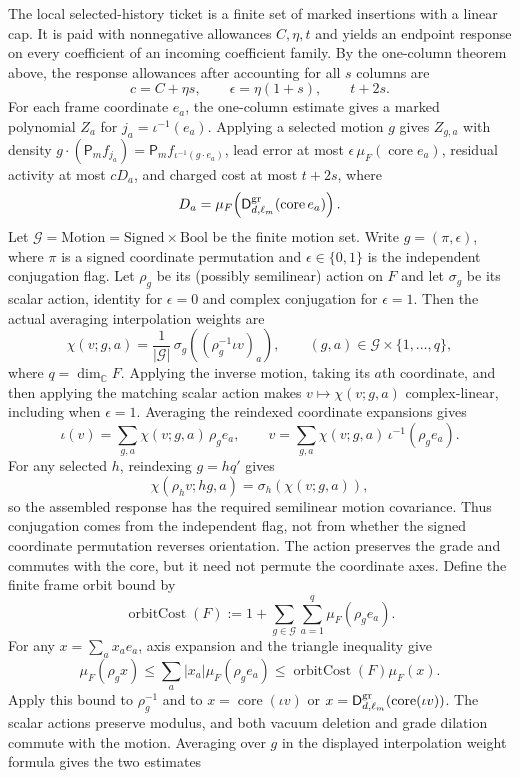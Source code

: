 The local selected-history ticket is a finite set of marked insertions with a linear cap. It is paid with nonnegative allowances $C,\eta,t$ and yields an endpoint response on every coefficient of an incoming coefficient family. By the one-column theorem above, the response allowances after accounting for all $s$ columns are
\[
  c=C+\eta s,\qquad \epsilon=\eta(1+s),\qquad t+2s.
\]
For each frame coordinate $e_a$, the one-column estimate gives a marked polynomial $Z_a$ for $j_a=\iota^{-1}(e_a)$. Applying a selected motion $g$ gives $Z_{g,a}$ with density $g\cdot(\mathsf P_m f_{j_a})=\mathsf P_m f_{\iota^{-1}(g\cdot e_a)}$, lead error at most $\epsilon\,\mu_F(\operatorname{core}e_a)$, residual activity at most $cD_a$, and charged cost at most $t+2s$, where
\[
 D_a=\mu_F\!\left(\mathsf D^{\rm gr}_{d,\ell_m}(\operatorname{core}e_a)\right).
\]
Let $\mathcal G=\mathrm{Motion}=\mathrm{Signed}\times\mathrm{Bool}$ be the finite motion set. Write $g=(\pi,\epsilon)$, where $\pi$ is a signed coordinate permutation and $\epsilon\in\{0,1\}$ is the independent conjugation flag. Let $\rho_g$ be its (possibly semilinear) action on $F$ and let $\sigma_g$ be its scalar action, identity for $\epsilon=0$ and complex conjugation for $\epsilon=1$. Then the actual averaging interpolation weights are
\[
 \chi(v;g,a)=\frac{1}{|\mathcal G|}\,
       \sigma_g\!\left((\rho_g^{-1}\iota v)_a\right),
 \qquad (g,a)\in\mathcal G\times\{1,\ldots,q\},
\]
where $q=\dim_{\mathbb C}F$. Applying the inverse motion, taking its $a$th coordinate, and then applying the matching scalar action makes $v\mapsto\chi(v;g,a)$ complex-linear, including when $\epsilon=1$. Averaging the reindexed coordinate expansions gives
\[
 \iota(v)=\sum_{g,a}\chi(v;g,a)\,\rho_g e_a,
 \qquad
 v=\sum_{g,a}\chi(v;g,a)\,\iota^{-1}(\rho_g e_a).
\]
For any selected $h$, reindexing $g=hq'$ gives
\[
 \chi(\rho_hv;hg,a)=\sigma_h(\chi(v;g,a)),
\]
so the assembled response has the required semilinear motion covariance. Thus conjugation comes from the independent flag, not from whether the signed coordinate permutation reverses orientation. The action preserves the grade and commutes with the core, but it need not permute the coordinate axes. Define the finite frame orbit bound by
\[
 \operatorname{orbitCost}(F)
 :=1+\sum_{g\in\mathcal G}\sum_{a=1}^{q}\mu_F(\rho_g e_a).
\]
For any $x=\sum_a x_a e_a$, axis expansion and the triangle inequality give
\[
 \mu_F(\rho_g x)\leq\sum_a|x_a|\mu_F(\rho_g e_a)
 \leq\operatorname{orbitCost}(F)\mu_F(x).
\]
Apply this bound to $\rho_g^{-1}$ and to $x=\operatorname{core}(\iota v)$ or $x=\mathsf D^{\rm gr}_{d,\ell_m}(\operatorname{core}(\iota v))$. The scalar actions preserve modulus, and both vacuum deletion and grade dilation commute with the motion. Averaging over $g$ in the displayed interpolation weight formula gives the two estimates
